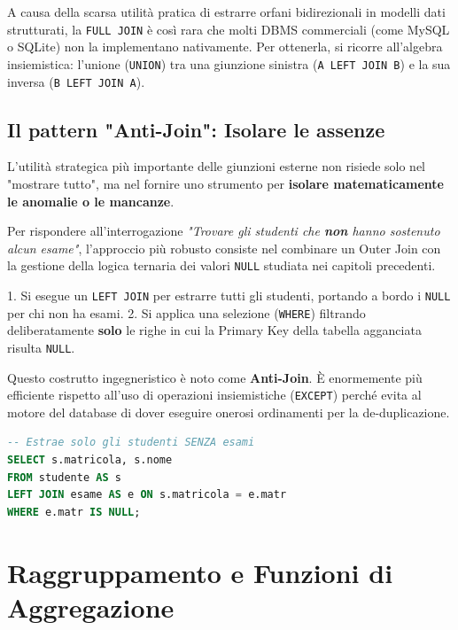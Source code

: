 \begin{observation}
A causa della scarsa utilità pratica di estrarre orfani bidirezionali in modelli dati strutturati, la \texttt{FULL JOIN} è così rara che molti DBMS commerciali (come MySQL o SQLite) non la implementano nativamente. Per ottenerla, si ricorre all'algebra insiemistica: l'unione (\texttt{UNION}) tra una giunzione sinistra (\texttt{A LEFT JOIN B}) e la sua inversa (\texttt{B LEFT JOIN A}).
\end{observation}

\subsection{Il pattern "Anti-Join": Isolare le assenze}

L'utilità strategica più importante delle giunzioni esterne non risiede solo nel "mostrare tutto", ma nel fornire uno strumento per \textbf{isolare matematicamente le anomalie o le mancanze}. 

Per rispondere all'interrogazione \textit{"Trovare gli studenti che \textbf{non} hanno sostenuto alcun esame"}, l'approccio più robusto consiste nel combinare un Outer Join con la gestione della logica ternaria dei valori \texttt{NULL} studiata nei capitoli precedenti.

1. Si esegue un \texttt{LEFT JOIN} per estrarre tutti gli studenti, portando a bordo i \texttt{NULL} per chi non ha esami.
2. Si applica una selezione (\texttt{WHERE}) filtrando deliberatamente \textbf{solo} le righe in cui la Primary Key della tabella agganciata risulta \texttt{NULL}.

Questo costrutto ingegneristico è noto come \textbf{Anti-Join}. È enormemente più efficiente rispetto all'uso di operazioni insiemistiche (\texttt{EXCEPT}) perché evita al motore del database di dover eseguire onerosi ordinamenti per la de-duplicazione.

\begin{lstlisting}[language=SQL, basicstyle=\ttfamily\small, keywordstyle=\color{blue}\bfseries]
-- Estrae solo gli studenti SENZA esami 
SELECT s.matricola, s.nome
FROM studente AS s
LEFT JOIN esame AS e ON s.matricola = e.matr
WHERE e.matr IS NULL;
\end{lstlisting}

\section{Raggruppamento e Funzioni di Aggregazione}

